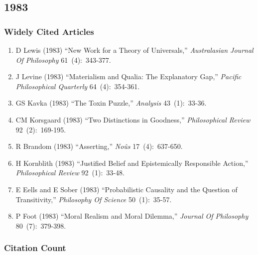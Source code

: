 \documentclass[
  10pt,
  letterpaper,
  DIV=11,
  numbers=noendperiod,
  twoside]{scrartcl}
\providecommand{\tightlist}{%
  \setlength{\itemsep}{0pt}\setlength{\parskip}{0pt}}\usepackage{longtable,booktabs,array}
\begin{document}
\newpage

\subsection{1983}\label{sec-s1983}

\subsubsection*{Widely Cited Articles}\label{widely-cited-articles-26}

\begin{enumerate}
\def\labelenumi{\arabic{enumi}.}
\tightlist
\item
  D Lewis (1983) ``New Work for a Theory of Universals,''
  \emph{Australasian Journal Of Philosophy} 61~(4):~343-377.
\item
  J Levine (1983) ``Materialism and Qualia: The Explanatory Gap,''
  \emph{Pacific Philosophical Quarterly} 64~(4):~354-361.
\item
  GS Kavka (1983) ``The Toxin Puzzle,'' \emph{Analysis} 43~(1):~33-36.
\item
  CM Korsgaard (1983) ``Two Distinctions in Goodness,''
  \emph{Philosophical Review} 92~(2):~169-195.
\item
  R Brandom (1983) ``Asserting,'' \emph{Noûs} 17~(4):~637-650.
\item
  H Kornblith (1983) ``Justified Belief and Epistemically Responsible
  Action,'' \emph{Philosophical Review} 92~(1):~33-48.
\item
  E Eells and E Sober (1983) ``Probabilistic Causality and the Question
  of Transitivity,'' \emph{Philosophy Of Science} 50~(1):~35-57.
\item
  P Foot (1983) ``Moral Realism and Moral Dilemma,'' \emph{Journal Of
  Philosophy} 80~(7):~379-398.
\end{enumerate}

\subsubsection*{Citation Count}\label{sec-count-1983}
\end{document}
